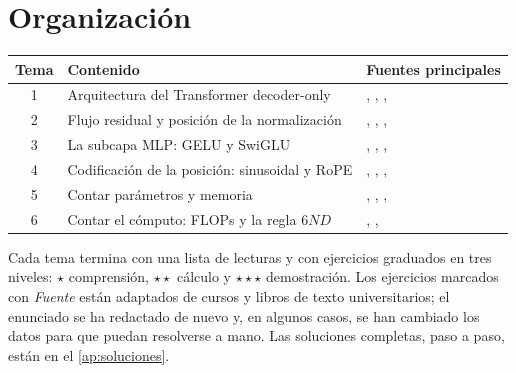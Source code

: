 \documentclass[11pt,a4paper,twoside,openany]{book}
\begin{document}
\section*{Organización}
\begin{center}
\begin{tabular}{@{}cll@{}}
\toprule
Tema & Contenido & Fuentes principales \\
\midrule
1 & Arquitectura del Transformer decoder-only & \cite{vaswani}, \cite{gpt2}, \cite{jm3}, \cite{bishopdl} \\
2 & Flujo residual y posición de la normalización & \cite{xiong}, \cite{gpt2}, \cite{elhage}, \cite{cs336} \\
3 & La subcapa MLP: GELU y SwiGLU & \cite{vaswani}, \cite{shazeer}, \cite{llama}, \cite{cs336} \\
4 & Codificación de la posición: sinusoidal y RoPE & \cite{vaswani}, \cite{roformer}, \cite{d2l}, \cite{cs224n} \\
5 & Contar parámetros y memoria & \cite{kaplan}, \cite{llama2}, \cite{jm3}, \cite{cs336} \\
6 & Contar el cómputo: FLOPs y la regla $6ND$ & \cite{kaplan}, \cite{llama2}, \cite{cs336} \\
\bottomrule
\end{tabular}
\end{center}

Cada tema termina con una lista de lecturas y con ejercicios graduados en tres niveles: $\star$ comprensión, $\star\star$ cálculo y $\star\star\star$ demostración. Los ejercicios marcados con \emph{Fuente} están adaptados de cursos y libros de texto universitarios; el enunciado se ha redactado de nuevo y, en algunos casos, se han cambiado los datos para que puedan resolverse a mano. Las soluciones completas, paso a paso, están en el \cref{ap:soluciones}.
\end{document}
